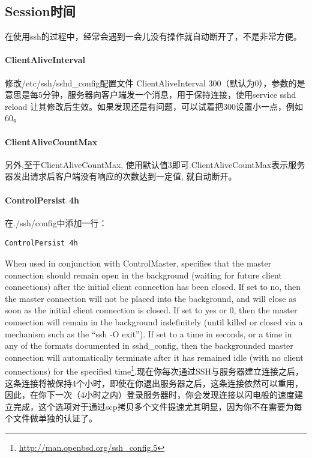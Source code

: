 \documentclass[letter]{book}
\begin{document}
\subsection{Session时间}

在使用ssh的过程中，经常会遇到一会儿没有操作就自动断开了，不是非常方便。

\paragraph{ClientAliveInterval}

修改/etc/ssh/sshd\_config配置文件 ClientAliveInterval 300（默认为0），参数的是意思是每5分钟，服务器向客户端发一个消息，用于保持连接，使用service sshd reload 让其修改后生效。如果发现还是有问题，可以试着把300设置小一点，例如60。

\paragraph{ClientAliveCountMax}

另外,至于ClientAliveCountMax, 使用默认值3即可.ClientAliveCountMax表示服务器发出请求后客户端没有响应的次数达到一定值, 就自动断开。

\paragraph{ControlPersist 4h}

在./ssh/config中添加一行：

\begin{lstlisting}[language=Bash]
ControlPersist 4h
\end{lstlisting}

When used in conjunction with ControlMaster, specifies that the master connection should remain open in the background (waiting for future client connections) after the initial client connection has been closed. If set to no, then the master connection will not be placed into the background, and will close as soon as the initial client connection is closed. If set to yes or 0, then the master connection will remain in the background indefinitely (until killed or closed via a mechanism such as the “ssh -O exit”). If set to a time in seconds, or a time in any of the formats documented in sshd\_config, then the backgrounded master connection will automatically terminate after it has remained idle (with no client connections) for the specified time\footnote{\url{http://man.openbsd.org/ssh_config.5}}.现在你每次通过SSH与服务器建立连接之后，这条连接将被保持4个小时，即使在你退出服务器之后，这条连接依然可以重用，因此，在你下一次（4小时之内）登录服务器时，你会发现连接以闪电般的速度建立完成，这个选项对于通过scp拷贝多个文件提速尤其明显，因为你不在需要为每个文件做单独的认证了。
\end{document}

